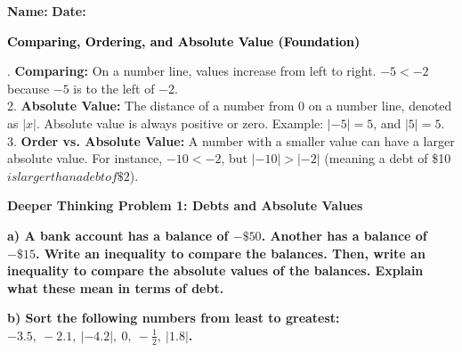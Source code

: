 \documentclass[12pt, letterpaper, fleqn]{article}
\begin{document}
\textbf{Name:} \underline{\hspace{5cm}}
\hfill
\textbf{Date:} \underline{\hspace{3cm}}\\

\begin{tcolorbox}[colback=customteal!20]
    \large\textcolor{black}{\textbf{Comparing, Ordering, and Absolute Value (Foundation)}}
\end{tcolorbox}

\vspace{3mm}

. \textbf{Comparing:} On a number line, values increase from left to right. $-5 < -2$ because $-5$ is to the left of $-2$. \\
2. \textbf{Absolute Value:} The distance of a number from 0 on a number line, denoted as $|x|$. Absolute value is always positive or zero. Example: $|-5| = 5$, and $|5| = 5$. \\
3. \textbf{Order vs. Absolute Value:} A number with a smaller value can have a larger absolute value. For instance, $-10 < -2$, but $|-10| > |-2|$ (meaning a debt of \$10$ is larger than a debt of \$2$).

\vspace{4mm}

\begin{tcolorbox}[colback=yellow!15, colframe=orange, boxrule=1.5pt, arc=4mm, left=6mm, right=6mm, top=5mm, bottom=5mm]
\textbf{Deeper Thinking Problem 1: Debts and Absolute Values}

\medskip

\noindent
\textbf{a) A bank account has a balance of $-\$50$. Another has a balance of $-\$15$. Write an inequality to compare the balances. Then, write an inequality to compare the absolute values of the balances. Explain what these mean in terms of debt.}

\vspace{2cm}

\noindent
\textbf{b) Sort the following numbers from least to greatest: $-3.5, \ -2.1, \ |-4.2|, \ 0, \ -\frac{1}{2}, \ |1.8|$.}

\vspace{2cm}
\end{tcolorbox}
\newpage
\end{document}
